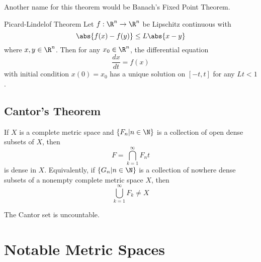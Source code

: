 Another name for this theorem would be Banach's Fixed Point Theorem. 

\begin{thm}{Picard-Lindelof Theorem}{} Let $f:\R^n\to\R^n$ be Lipschitz continuous with $$\abs{f(x)-f(y)}\leq L\abs{x-y}$$ where $x,y\in\R^n$. Then for any $x_0\in\R^n$, the differential equation $$\frac{dx}{dt}=f(x)$$ with initial condition $x(0)=x_0$ has a unique solution on $[-t,t]$ for any $Lt<1$. 
\end{thm}

\subsection{Cantor's Theorem}
\begin{thm}{}{} If $X$ is a complete metric space and $\{F_n|n\in\N\}$ is a collection of open dense subsets of $X$, then $$F=\bigcap_{k=1}^\infty F_nt$$ is dense in $X$. Equivalently, if $\{G_n|n\in\N\}$ is a collection of nowhere dense subsets of a nonempty complete metric space $X$, then $$\bigcup_{k=1}^\infty F_k\neq X$$
\end{thm}

\begin{lmm}{}{} The Cantor set is uncountable. 
\end{lmm}







\pagebreak
\section{Notable Metric Spaces}
